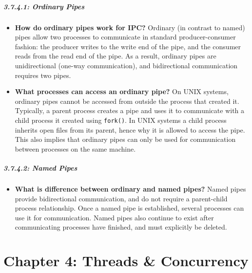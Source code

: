 \documentclass[12pt]{article}
\begin{document}
\subsubsection*{3.7.4.1: Ordinary Pipes}

\begin{itemize}
    \item \textbf{How do ordinary pipes work for IPC?} Ordinary (in contrast to named) pipes allow two processes to communicate in standard producer-consumer fashion: the producer writes to the write end of the pipe, and the consumer reads from the read end of the pipe. As a result, ordinary pipes are unidirectional (one-way communication), and bidirectional communication requires two pipes.
    \item \textbf{What processes can access an ordinary pipe?} On UNIX systems, ordinary pipes cannot be accessed from outside the process that created it. Typically, a parent process creates a pipe and uses it to communicate with a child process it created using \texttt{fork()}. In UNIX systems a child process inherits open files from its parent, hence why it is allowed to access the pipe. This also implies that ordinary pipes can only be used for communication between processes on the same machine.
\end{itemize}

\subsubsection*{3.7.4.2: Named Pipes}

\begin{itemize}
    \item \textbf{What is difference between ordinary and named pipes?} Named pipes provide bidirectional communication, and do not require a parent-child process relationship. Once a named pipe is established, several processes can use it for communication. Named pipes also continue to exist after communicating processes have finished, and must explicitly be deleted.
\end{itemize}

\part*{Chapter 4: Threads \& Concurrency}
\end{document}

